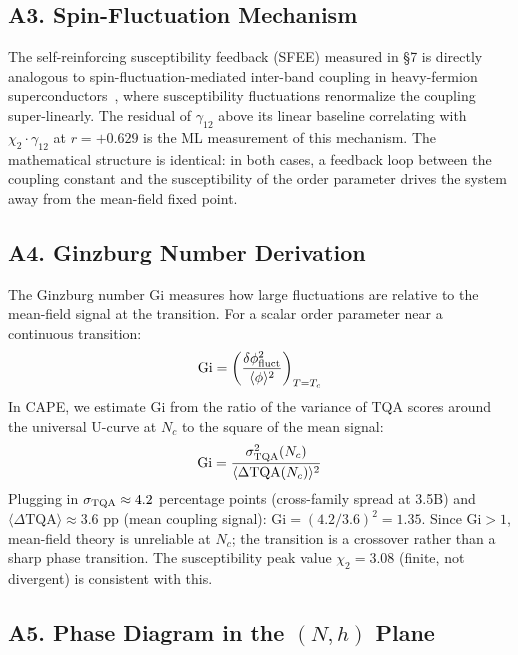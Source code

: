 \documentclass[11pt]{article}
\begin{document}
\subsection*{A3. Spin-Fluctuation Mechanism}

The self-reinforcing susceptibility feedback (SFEE) measured in \S7 is directly analogous to spin-fluctuation-mediated inter-band coupling in heavy-fermion superconductors~\cite{amin2020}, where susceptibility fluctuations renormalize the coupling super-linearly.
The residual of $\gamma_{12}$ above its linear baseline correlating with $\chi_2 \cdot \gamma_{12}$ at $r = +0.629$ is the ML measurement of this mechanism.
The mathematical structure is identical: in both cases, a feedback loop between the coupling constant and the susceptibility of the order parameter drives the system away from the mean-field fixed point.

\subsection*{A4. Ginzburg Number Derivation}

The Ginzburg number $\mathrm{Gi}$ measures how large fluctuations are relative to the mean-field signal at the transition.
For a scalar order parameter near a continuous transition:
\begin{equation}
  \mathrm{Gi} = \left(\frac{\delta\phi^2_{\rm fluct}}{\langle\phi\rangle^2}\right)_{T=T_c}
\end{equation}
In CAPE, we estimate $\mathrm{Gi}$ from the ratio of the variance of TQA scores around the universal U-curve at $N_c$ to the square of the mean signal:
\begin{equation}
  \mathrm{Gi} = \frac{\sigma^2_{\rm TQA}(N_c)}{\langle \Delta\mathrm{TQA}(N_c) \rangle^2}
\end{equation}
Plugging in $\sigma_{\rm TQA} \approx 4.2$ percentage points (cross-family spread at 3.5B) and $\langle\Delta\mathrm{TQA}\rangle \approx 3.6$ pp (mean coupling signal):
$\mathrm{Gi} = (4.2/3.6)^2 = 1.35$.
Since $\mathrm{Gi} > 1$, mean-field theory is unreliable at $N_c$; the transition is a crossover rather than a sharp phase transition.
The susceptibility peak value $\chi_2 = 3.08$ (finite, not divergent) is consistent with this.

\subsection*{A5. Phase Diagram in the $(N, h)$ Plane}
\end{document}
